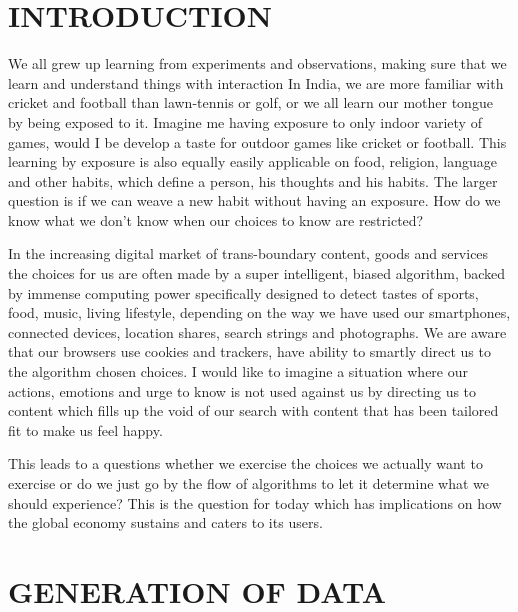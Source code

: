 \begin{multicols}{2}

\section{INTRODUCTION}

We all grew up learning from experiments and observations, making sure that we learn and understand things with interaction In India, we are more familiar with cricket and football than lawn-tennis or golf, or we all learn our mother tongue by being exposed to it. Imagine me having exposure to only indoor variety of games, would I be develop a taste for outdoor games like cricket or football. This learning by exposure is also equally easily applicable on food, religion, language and other habits, which define a person, his thoughts and his habits. The larger question is if we can weave a new habit without having an exposure. How do we know what we don’t know when our choices to know are restricted? 

In the increasing digital market of trans-boundary content, goods and services the choices for us are often made by a super intelligent, biased algorithm, backed by immense computing power specifically designed to detect tastes of sports, food, music, living lifestyle, depending on the way we have used our smartphones, connected devices, location shares, search strings and photographs. We are aware that our browsers use cookies and trackers, have ability to smartly direct us to the algorithm chosen choices. I would like to imagine a situation where our actions, emotions and urge to know is not used against us by directing us to content which fills up the void of our search with content that has been tailored fit to make us feel happy.

This leads to a questions whether we exercise the choices we actually want to exercise or do we just go by the flow of algorithms to let it determine what we should experience? This is the question for today which has implications on how the global economy sustains and caters to its users.

\section{GENERATION OF DATA}


\end{multicols}

